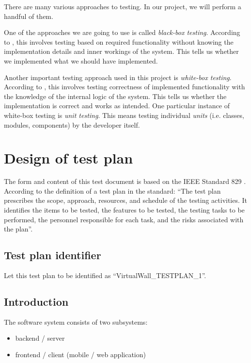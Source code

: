 \documentclass[11pt]{book}
\begin{document}
There are many various approaches to testing. In our project, we will perform a handful of them.

One of the approaches we are going to use is called \emph{black-box testing}. According to \cite{shinde}, this involves testing based on required functionality without knowing the implementation details and inner workings of the system. This tells us whether we implemented what we should have implemented.

Another important testing approach used in this project is \emph{white-box testing}. According to \cite{shinde}, this involves testing correctness of implemented functionality with the knowledge of the internal logic of the system. This tells us whether the implementation is correct and works as intended. One particular instance of white-box testing is \emph{unit testing}. This means testing individual \emph{units} (i.e. classes, modules, components) by the developer itself.

\section{Design of test plan}

The form and content of this test document is based on the IEEE Standard 829 \cite{ieee829}. According to the definition of a test plan in the standard: ``The test plan prescribes the scope, approach, resources, and schedule of the testing activities. It identifies the items to be tested, the features to be tested, the testing tasks to be performed, the personnel responsible for each task, and the risks associated with the plan''.

\subsection{Test plan identifier}
Let this test plan to be identified as ``VirtualWall\_TESTPLAN\_1''.

\subsection{Introduction}
The \systemname software system consists of two subsystems:

\begin{itemize}
    \item backend / server
    \item frontend / client (mobile / web application)
\end{itemize}
\end{document}

